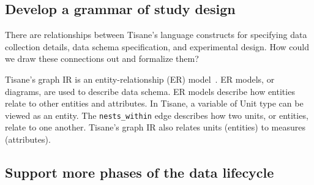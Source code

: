 \subsection{Develop a grammar of study design}
There are relationships between Tisane's language constructs for specifying data
collection details, data schema specification, and experimental design. How
could we draw these connections out and formalize them? 

Tisane's graph IR is an entity-relationship (ER) model~\cite{chen1976ERDiagram}.
ER models, or diagrams, are used to describe data schema. ER models describe how
entities relate to other entities and attributes. In Tisane, a variable of Unit
type can be viewed as an entity. The \texttt{nests\_within} edge describes how
two units, or entities, relate to one another. Tisane's graph IR also relates
units (entities) to measures (attributes).

\subsection{Support more phases of the data lifecycle}
\begin{comment}
This dissertation identifies the need for improved abstractions for authoring
statistical analyses. I argue that the appropriate abstractions should capture
the implicit domain knowledge analysts bring to their data and show the benefits
to users for doing so: valid statistical analysis formulation and increased
reflection among analysts about their domain and data. From an engineering
perspective, these abstractions allow tool designers to separate the conceptual
and statistical concerns involved in data analysis, using Tea and Tisane as
platforms for experimenting with alternative statistical model derivations and
formulations. Given that implicit assumptions about a domain pervade the entire
data lifecycle, what if we could take a similar approach throughout? What would
the appropriate data structures for capturing domain knowledge look like at each
phase? How could a new ecosystem of software tools use these representations
such that the evolution of conceptual knowledge could be tracked and traced in
meaningful ways.  -- some research questions to ask/address

A fertile area to try this integration is in connecting statistical analysis
with visual analysis
\end{comment}

